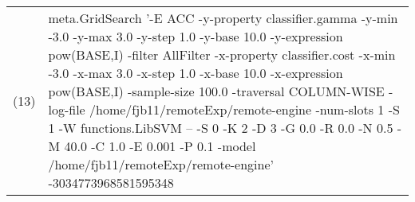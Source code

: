 \begin{table}[thb]
{\begin{tabular}{cl}
(13) & meta.GridSearch '-E ACC -y-property classifier.gamma -y-min -3.0 -y-max 3.0 -y-step 1.0 -y-base 10.0 -y-expression pow(BASE,I) -filter AllFilter -x-property classifier.cost -x-min -3.0 -x-max 3.0 -x-step 1.0 -x-base 10.0 -x-expression pow(BASE,I) -sample-size 100.0 -traversal COLUMN-WISE -log-file /home/fjb11/remoteExp/remote-engine -num-slots 1 -S 1 -W functions.LibSVM -- -S 0 -K 2 -D 3 -G 0.0 -R 0.0 -N 0.5 -M 40.0 -C 1.0 -E 0.001 -P 0.1 -model /home/fjb11/remoteExp/remote-engine' -3034773968581595348 \\
\end{tabular}
}
\end{table}

